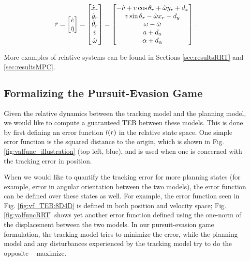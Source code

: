 \begin{equation}
\label{eq:5D_and_3D_rdyn}
\dot \rstate = 
\begin{bmatrix}
\dot \estate\\
\dot \astate
\end{bmatrix}
=
\begin{bmatrix}
\dot x_r\\
\dot y_r\\
\dot\theta_r\\
\dot v\\
\dot \omega
\end{bmatrix}
=
\begin{bmatrix}
- \hat v + v \cos \theta_r + \hat \omega y_r + \dstb_x\\
v \sin \theta_r - \hat \omega x_r + \dstb_y\\
\omega - \hat \omega \\
a + \dstb_a\\
\alpha + \dstb_\alpha
\end{bmatrix}.
\end{equation}

More examples of relative systems can be found in Sections \ref{sec:resultsRRT} and \ref{sec:resultsMPC}.

\subsection{Formalizing the Pursuit-Evasion Game}
Given the relative dynamics between the tracking model and the planning model, we would like to compute a guaranteed TEB between these models. 
This is done by first defining an error function $l(r)$ in the relative state space. 
One simple error function is the squared distance to the origin, which is shown in Fig. \ref{fig:valfunc_illustration} (top left, blue), and is used when one is concerned with the tracking error in position.

When we would like to quantify the tracking error for more planning states (for example, error in angular orientation between the two models), the error function can be defined over these states as well.
For example, the error function seen in Fig. \ref{fig:vf_TEB:8D4D} is defined in both position and velocity space; Fig. \ref{fig:valfuncRRT} shows yet another error function defined using the one-norm of the displacement between the two models. 
In our pursuit-evasion game formulation, the tracking model tries to minimize the error, while the planning model and any disturbances experienced by the tracking model try to do the opposite -- maximize.

